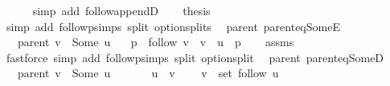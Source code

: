 \begin{isabellebody}
\ \ \ \ \isamarkupfalse%
\ {\isacharparenleft}{\kern0pt}simp\ add{\isacharcolon}{\kern0pt}\ follow{\isacharunderscore}{\kern0pt}appendD{\isacharparenright}{\kern0pt}\isanewline
\ \ \isamarkupfalse%
\ {\isacharquery}{\kern0pt}thesis\isanewline
\ \ \ \ \isamarkupfalse%
\ {\isacharparenleft}{\kern0pt}simp\ add{\isacharcolon}{\kern0pt}\ follow{\isacharunderscore}{\kern0pt}psimps\ split{\isacharcolon}{\kern0pt}\ option{\isachardot}{\kern0pt}splits{\isacharparenleft}{\kern0pt}{}{\isacharparenright}{\kern0pt}{\isacharparenright}{\kern0pt}\isanewline
{}\isamarkupfalse%
%
\endisatagproof
{\isafoldproof}%
%
\isadelimproof
\isanewline
%
\endisadelimproof
%
\isadeliminvisible
\isanewline
%
\endisadeliminvisible
%
\isataginvisible
{}\isamarkupfalse%
\ {\isacharparenleft}{\kern0pt}\ parent{\isacharparenright}{\kern0pt}\ parent{\isacharunderscore}{\kern0pt}eq{\isacharunderscore}{\kern0pt}SomeE{\isacharcolon}{\kern0pt}\isanewline
\ \ \ {\isachardoublequoteopen}parent\ v\ {\isacharequal}{\kern0pt}\ Some\ u{\isachardoublequoteclose}\isanewline
\ \ \ p\ \ {\isachardoublequoteopen}follow\ v\ {\isacharequal}{\kern0pt}\ v\ {\isacharhash}{\kern0pt}\ u\ {\isacharhash}{\kern0pt}\ p{\isachardoublequoteclose}%
\endisataginvisible
{\isafoldinvisible}%
%
\isadeliminvisible
\isanewline
%
\endisadeliminvisible
%
\isadelimproof
\ \ %
\endisadelimproof
%
\isatagproof
{}\isamarkupfalse%
\ assms\isanewline
\ \ \isamarkupfalse%
\ {\isacharparenleft}{\kern0pt}fastforce\ simp\ add{\isacharcolon}{\kern0pt}\ follow{\isacharunderscore}{\kern0pt}psimps\ split{\isacharcolon}{\kern0pt}\ option{\isachardot}{\kern0pt}split{\isacharparenright}{\kern0pt}%
\endisatagproof
{\isafoldproof}%
%
\isadelimproof
\isanewline
%
\endisadelimproof
%
\isadeliminvisible
\isanewline
%
\endisadeliminvisible
%
\isataginvisible
{}\isamarkupfalse%
\ {\isacharparenleft}{\kern0pt}\ parent{\isacharparenright}{\kern0pt}\ parent{\isacharunderscore}{\kern0pt}eq{\isacharunderscore}{\kern0pt}SomeD{\isacharcolon}{\kern0pt}\isanewline
\ \ \ {\isachardoublequoteopen}parent\ v\ {\isacharequal}{\kern0pt}\ Some\ u{\isachardoublequoteclose}\isanewline
\ \ \isanewline
\ \ \ \ {\isachardoublequoteopen}u\ {\isasymnoteq}\ v{\isachardoublequoteclose}\isanewline
\ \ \ \ {\isachardoublequoteopen}v\ {\isasymnotin}\ set\ {\isacharparenleft}{\kern0pt}follow\ u{\isacharparenright}{\kern0pt}{\isachardoublequoteclose}%

\end{isabellebody}
